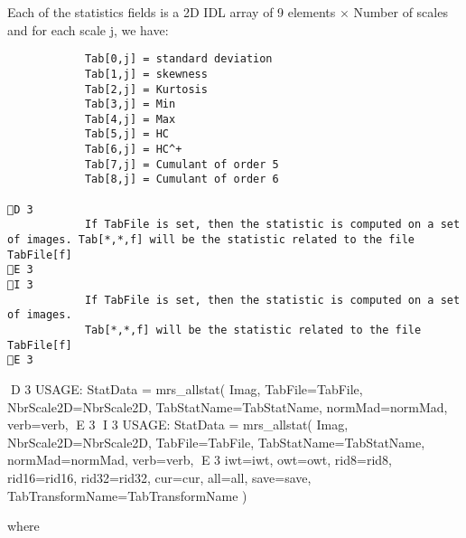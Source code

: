 Each of the statistics fields is a 2D IDL array of 9 elements $\times$ Number of scales and for each scale j, we have:
\begin{verbatim}
			Tab[0,j] = standard deviation
			Tab[1,j] = skewness
			Tab[2,j] = Kurtosis
			Tab[3,j] = Min
			Tab[4,j] = Max 
			Tab[5,j] = HC
			Tab[6,j] = HC^+
			Tab[7,j] = Cumulant of order 5
			Tab[8,j] = Cumulant of order 6

D 3
			If TabFile is set, then the statistic is computed on a set of images. Tab[*,*,f] will be the statistic related to the file TabFile[f]
E 3
I 3
			If TabFile is set, then the statistic is computed on a set of images.
			Tab[*,*,f] will be the statistic related to the file TabFile[f]
E 3
\end{verbatim}
{\bf
\begin{center}
D 3
     USAGE: StatData = mrs\_allstat( Imag, TabFile=TabFile, NbrScale2D=NbrScale2D, TabStatName=TabStatName, normMad=normMad, verb=verb, 
E 3
I 3
     USAGE: StatData = mrs\_allstat( Imag, NbrScale2D=NbrScale2D, TabFile=TabFile, TabStatName=TabStatName, normMad=normMad, verb=verb, 
E 3
     iwt=iwt, owt=owt, rid8=rid8, rid16=rid16, rid32=rid32, cur=cur, all=all, save=save, TabTransformName=TabTransformName )
\end{center}}
where 
